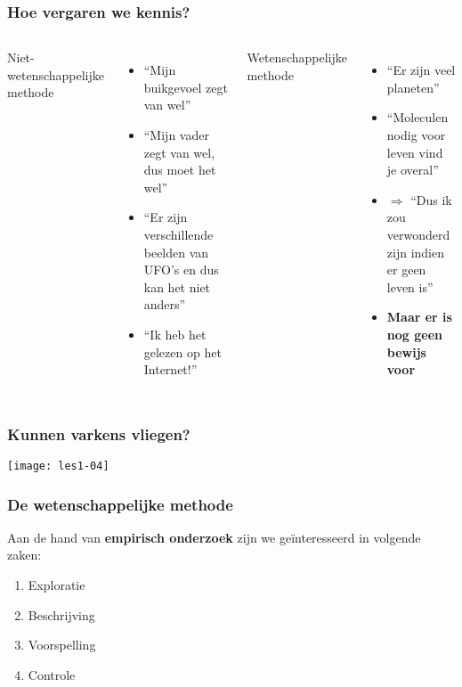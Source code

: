 \documentclass[aspectratio=169]{beamer}
\begin{document}
\begin{frame}
  \frametitle{Hoe vergaren we kennis?}
  
  \begin{columns}[c]
    
    Niet-wetenschappelijke methode
    \begin{itemize}
      \item ``Mijn buikgevoel zegt van wel''
      \item ``Mijn vader zegt van wel, dus moet het wel''
      \item ``Er zijn verschillende beelden van UFO's en dus kan het niet anders''
      \item ``Ik heb het gelezen op het Internet!''
    \end{itemize}
    
    \pause
    
    Wetenschappelijke methode
    \begin{itemize}
      \item ``Er zijn veel planeten''
      \item ``Moleculen nodig voor leven vind je overal''
      \item $\Rightarrow$ ``Dus ik zou verwonderd zijn indien er geen leven is''
      \item \textbf{Maar er is nog geen bewijs voor}
    \end{itemize}
    
  \end{columns}
\end{frame}

\begin{frame}
  \frametitle{Kunnen varkens vliegen?}
  \centering
  \texttt{[image: les1-04]}
\end{frame}

\begin{frame}
  \frametitle{De wetenschappelijke methode}
  
  Aan de hand van \textbf{empirisch onderzoek} zijn we geïnteresseerd in volgende zaken:
  
  \begin{enumerate}
    \item Exploratie
    \item Beschrijving
    \item Voorspelling
    \item Controle
  \end{enumerate}
\end{frame}
\end{document}
